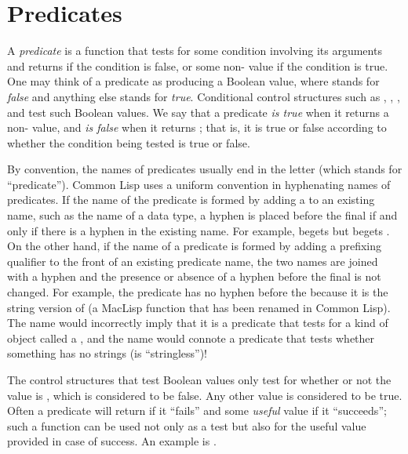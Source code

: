 
\clearpage\def\pagestatus{FINAL PROOF}

\chapter{Predicates}
\label{PREDS}

A {\it predicate} is a function that tests for some condition involving
its arguments and returns {\false} if the condition is false, or some
non-{\false} value if the condition is true.  One may think of a predicate as
producing a Boolean value, where {\false} stands for {\it false} and anything
else stands for {\it true}.  Conditional control structures such as
,
, , and  test such Boolean values.
We say that a predicate {\it is true} when it returns a non-{\false} value,
and {\it is false} when it returns {\false}; that is, it is true or false
according to whether the condition being tested is true or false.

By convention, the names of predicates usually end in the letter
 (which stands for ``predicate'').
Common Lisp uses a uniform convention in hyphenating names of predicates.
If the name of the predicate is formed by adding a  to
an existing name, such as the name of a data type,
a hyphen is placed before the final  if and only if there is
a hyphen in the existing name.  For example,  begets 
but  begets .
On the other hand, if the name of a predicate is formed by adding
a prefixing qualifier to the front of an existing predicate name,
the two names are joined with a hyphen and the presence or absence
of a hyphen before the final  is not changed.  For example,
the predicate  has no hyphen before the 
because it is the string version of  (a MacLisp function
that has been renamed \cd{<} in Common Lisp).  The name 
would incorrectly imply that it is a predicate that tests for a kind
of object called a , and the name 
would connote a predicate that tests whether something has no strings
(is ``stringless'')!

The control structures that test Boolean values only test for
whether or not the value is {\false}, which is considered to be false.  Any
other value is considered to be true.  Often a predicate will return {\false} if
it ``fails'' and some {\it useful} value if it ``succeeds'';
such a function can be used not only as a test but
also for the useful value provided in case of success.  An example
is .

